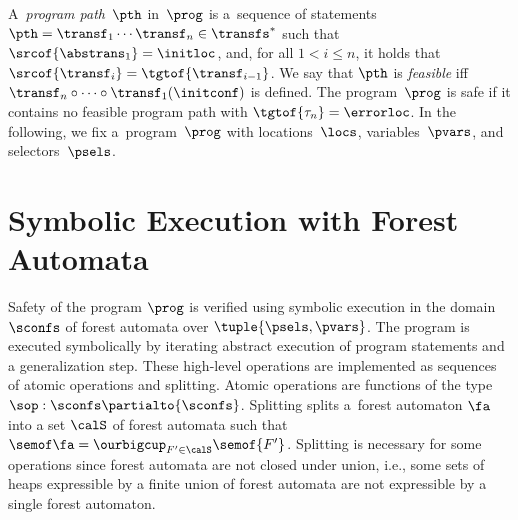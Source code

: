{%
A~\emph{program path}~$\pth$ in~$\prog$ is a~sequence of statements
$\pth = \transf_1 \cdots \transf_n \in \transfs^*$ such that
$\srcof{\abstrans_1} = \initloc$, and,
for all $1 < i \leq n$, it holds that
$\srcof{\transf_i} = \tgtof{\transf_{i-1}}$.
%
We say that $\pth$ is \emph{feasible}
iff
$\transf_n\circ\cdots\circ\transf_1(\initconf)$ is defined.
%
The program~$\prog$ is safe if it contains no feasible program path with
$\tgtof{\tau_n} = \errorloc$.
In the following, we fix a~program~$\prog$ with locations~$\locs$, variables~$\pvars$, and selectors~$\psels$.


\section{Symbolic Execution with Forest Automata} \label{sec:analysis}


Safety of the program $\prog$ is verified using symbolic execution in the domain $\sconfs$ of forest automata 
over $\tuple{\psels,\pvars}$.
%
The program is executed symbolically by iterating abstract execution of program statements and 
a generalization step.
%
%
These high-level operations
are implemented as sequences of atomic operations and splitting.
Atomic operations are functions of the type $\sop:\sconfs\partialto {\sconfs}$.
%
Splitting splits a~forest automaton $\fa$ into a set $\calS$ of forest automata such that $\semof\fa =\ourbigcup_{F' \in \calS} \semof{F'}$.
%
Splitting is necessary for some operations since forest automata are not
closed under union, i.e.,
some sets of heaps expressible by a finite union of forest automata 
are not expressible by a single forest automaton.
%

}
